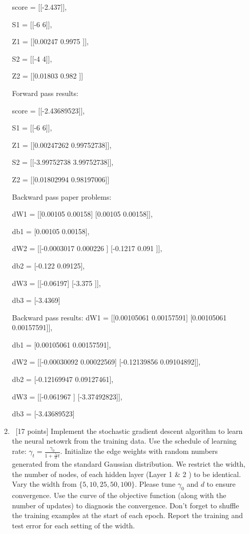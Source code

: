 \documentclass[12pt, fullpage,letterpaper]{article}
\begin{document}
\begin{enumerate}
\begin{enumerate}
	score = [[-2.437]],
	
	S1 = [[-6  6]], 

	Z1 = [[0.00247 0.9975 ]],

	S2 = [[-4  4]],

	Z2 = [[0.01803 0.982  ]]


	Forward pass results:

	score = [[-2.43689523]],

	S1 = [[-6  6]], 

	Z1 = [[0.00247262 0.99752738]],

	S2 = [[-3.99752738  3.99752738]],

	Z2 = [[0.01802994 0.98197006]]


	Backward pass paper problems:

	dW1 = [[0.00105 0.00158]
	[0.00105 0.00158]],

	db1 = [0.00105 0.00158], 
	
	dW2 = [[-0.0003017  0.000226 ]
	[-0.1217     0.091    ]],
	
	db2 = [-0.122    0.09125],
	
	dW3 = [[-0.06197]
	[-3.375  ]],
	
	db3 = [-3.4369]

	Backward pass results:
	dW1 = [[0.00105061 0.00157591]
	[0.00105061 0.00157591]],
	
	db1 = [0.00105061 0.00157591], 
	
	dW2 = [[-0.00030092  0.00022569]
	[-0.12139856  0.09104892]],
	
	db2 = [-0.12169947  0.09127461],
	
	dW3 = [[-0.061967  ]
	[-3.37492823]],
	
	db3 = [-3.43689523]

	
	\item~[17 points] Implement the stochastic gradient descent algorithm to learn the neural netowrk from the training data.  	Use the schedule of learning rate: $\gamma_t = \frac{\gamma_0}{1+\frac{\gamma_0}{d}t}	$.  Initialize the edge weights with random numbers generated from the standard Gaussian distribution. We restrict the width, \ie the number of nodes, of each hidden layer (\ie Layer 1 \& 2 ) to be identical.  Vary the width from $\{5, 10, 25, 50, 100\}$. Please tune $\gamma_0$ and $d$ to ensure convergence. Use the curve of the objective function (along with the number of updates) to diagnosis the convergence.  Don't forget to shuffle the training examples at the start of each epoch. Report the training and test error for each setting of the width.


\end{enumerate}
\end{enumerate}
\end{document}
